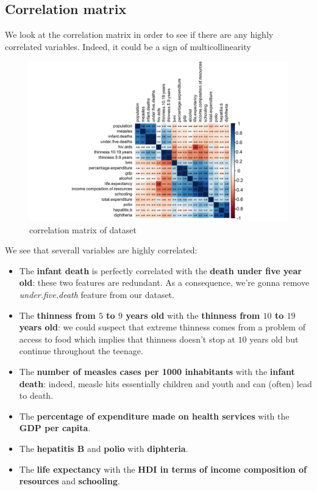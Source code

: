 \subsection{Correlation matrix}

We look at the correlation matrix in order to see if there are any highly correlated variables. Indeed, it could be a sign of multicollinearity

\begin{figure}[H]
	\centering
	\includegraphics{figures/eda/correlation_matrix.png}
	\caption{correlation matrix of dataset}
	\label{fig:correlation_matrix}
\end{figure}

We see that severall variables are highly correlated:
\begin{itemize}
	\item The \textbf{infant death} is perfectly correlated with the \textbf{death under five year old}: these two features are redundant. As a consequence, we're gonna remove \textit{under.five.death} feature from our dataset.
	\item The \textbf{thinness from $5$ to $9$ years old} with the \textbf{thinness from $10$ to $19$ years old}: we could suspect that extreme thinness comes from a problem of access to food which implies that thinness doesn't stop at $10$ years old but continue throughout the teenage.
	\item The \textbf{number of measles cases per 1000 inhabitants} with the \textbf{infant death}: indeed, measle hits essentially children and youth and can (often) lead to death.
	\item The \textbf{percentage of expenditure made on health services} with the \textbf{GDP per capita}.
	\item The \textbf{hepatitis B} and \textbf{polio} with \textbf{diphteria}.
	\item The \textbf{life expectancy} with the \textbf{HDI in terms of income composition of resources} and \textbf{schooling}.
\end{itemize}